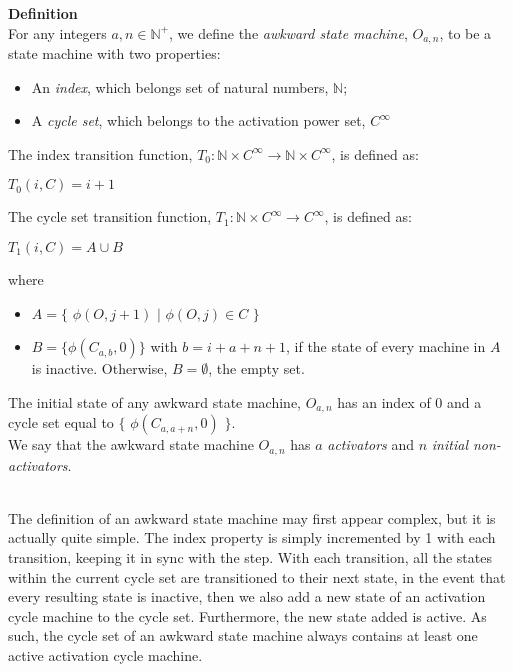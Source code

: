 \documentclass[a4paper,12pt]{article}
\begin{document}
\label{definition:cycle_machine}
\hypertarget{definition:cycle_machine}{}
\begin{tcolorbox}
\textbf{Definition}\\
For any integers $a, n \in \mathbb{N^+}$, we define the \textit{awkward state machine}, $O_{a,n}$, to be a state machine with two properties:

\begin{itemize}
\item An \textit{index}, which belongs set of natural numbers, $\mathbb{N}$;

\item A \textit{cycle set}, which belongs to the activation power set, $ C^{\infty}$

\end{itemize}

The index transition function, $T_0: \mathbb{N} \times C^{\infty} \rightarrow \mathbb{N} \times C^{\infty}$, is defined as:
\begin{center}
$T_0(i, C) = i + 1$
\end{center}

The cycle set transition function, $T_1: \mathbb{N} \times C^{\infty} \rightarrow C^{\infty}$, is defined as:
\begin{center}
$T_1(i, C) = A \cup B$
\end{center}
where
\begin{itemize}
\item $A = \{$ $\phi(O, j + 1)$ $|$ $\phi(O, j) \in C$ $\}$

\item $B = \{ \phi(C_{a, b}, 0) \}$ with $b = i + a + n + 1$, if the state of every machine in $A$ is inactive. Otherwise, $B = \emptyset$, the empty set.
\end{itemize}

The initial state of any awkward state machine, $O_{a,n}$ has an index of $0$ and a cycle set equal to $\{$ $\phi(C_{a, a + n}, 0)$ $\}$.\\

We say that the awkward state machine $O_{a,n}$ has $a$ \textit{activators} and $n$ \textit{initial non-activators}.
\end{tcolorbox}



\noindent \\ The definition of an awkward state machine may first appear complex, but it is actually quite simple. The index property is simply incremented by 1 with each transition, keeping it in sync with the step. With each transition, all the states within the current cycle set are transitioned to their next state, in the event that every resulting state is inactive, then we also add a new state of an activation cycle machine to the cycle set. Furthermore, the new state added is active. As such, the cycle set of an awkward state machine always contains at least one active activation cycle machine.
\end{document}
